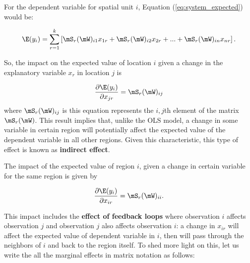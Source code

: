 \documentclass[english,12pt]{book}\usepackage[]{graphicx}\usepackage[]{xcolor}
\begin{document}
For the dependent variable for spatial unit $i$, Equation (\ref{eq:system_expected}) would be:

\begin{equation}
\E(y_i) = \sum_{r=1}^k\left[\mS_r(\mW)_{i1}x_{1r} + \mS_r(\mW)_{i2}x_{2r} + ... + \mS_r(\mW)_{in}x_{nr}\right].
\end{equation}

So, the impact on the expected value of location $i$ given a change in the explanatory variable $x_r$ in location $j$ is

\begin{equation}\label{eq:indirect_impact}
\frac{\partial \E(y_i)}{\partial x_{jr}} = \mS_r(\mW)_{ij}
\end{equation}
%
where $\mS_r(\mW)_{ij}$ is this equation represents the $i,j$th element of the matrix $\mS_r(\mW)$. This result implies that, unlike the OLS model, a change in some variable in certain region will potentially affect the expected value of the dependent variable in all other regions. Given this characteristic, this type of effect is known as \textbf{indirect effect}.

The impact of the expected value of region $i$, given a change in certain variable for the same region is given by

\begin{equation}\label{eq:direct_impact}
\frac{\partial \E(y_i)}{\partial x_{ir}} = \mS_r(\mW)_{ii}.
\end{equation}

This impact includes the \textbf{effect of feedback loops} where observation $i$ affects observation $j$ and observation $j$ also affects observation $i$: a change in $x_{ir}$ will affect the expected value of dependent variable in $i$, then will pass through the neighbors of $i$ and back to the region itself. To shed more light on this, let us write the all the marginal effects in matrix notation as follows:
\end{document}
